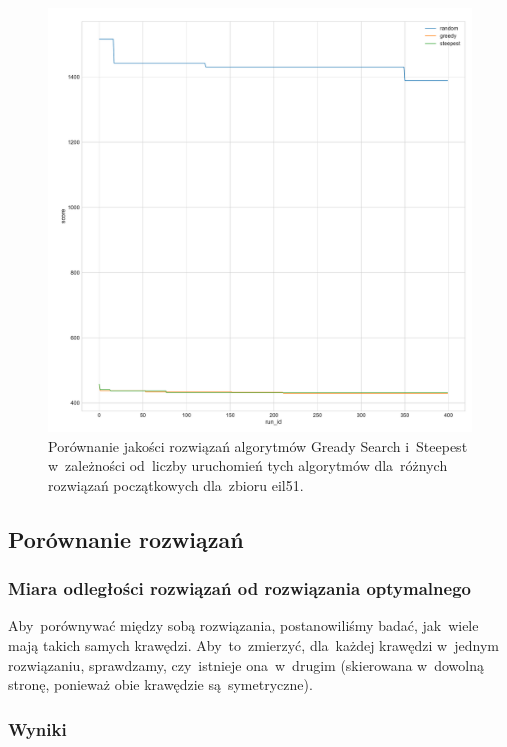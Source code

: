 \begin{figure}[H]
\begin{center}
\includegraphics[width=1.0\textwidth]{graphs/multi_start_scoreeil51.pdf}
\end{center}
\caption{Porównanie jakości rozwiązań algorytmów Gready Search i~Steepest w~zależności od~liczby uruchomień tych algorytmów dla~różnych rozwiązań początkowych dla~zbioru eil51.}
\label{fig:more_eil}
\end{figure}

\subsection{Porównanie rozwiązań}

\subsubsection{Miara odległości rozwiązań od rozwiązania optymalnego}

Aby~porównywać między sobą rozwiązania, postanowiliśmy badać, jak~wiele mają takich samych krawędzi. Aby~to~zmierzyć, dla~każdej krawędzi w~jednym rozwiązaniu, sprawdzamy, czy~istnieje ona~w~drugim (skierowana w~dowolną stronę, ponieważ obie krawędzie są~symetryczne).

\subsubsection{Wyniki}

